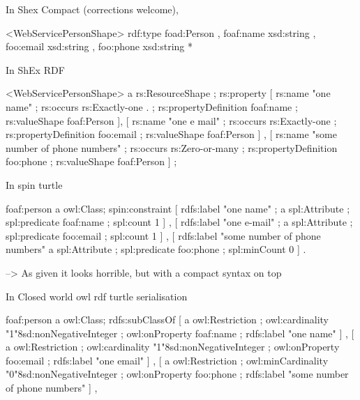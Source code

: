 \documentclass{llncs}
\begin{document}
In Shex Compact (corrections welcome),

\begin{ex}
<WebServicePersonShape> {
  rdf:type foad:Person ,
  foaf:name xsd:string ,
  foo:email xsd:string ,
  foo:phone xsd:string *
}
\end{ex}

In ShEx RDF
\begin{ex}
<WebServicePersonShape> a rs:ResourceShape ;
     rs:property  [ rs:name                "one name" ;
                    rs:occurs              rs:Exactly-one .  ;
                    rs:propertyDefinition  foaf:name ;
                    rs:valueShape          foaf:Person
                   ],
                   [ rs:name                "one e mail" ;
                    rs:occurs              rs:Exactly-one ;
                    rs:propertyDefinition  foo:email ;
                    rs:valueShape          foaf:Person
                   ] ,
                   [ rs:name                "some number of phone numbers" ;
                    rs:occurs              rs:Zero-or-many ;
                    rs:propertyDefinition  foo:phone ;
                    rs:valueShape          foaf:Person
                   ] ;
\end{ex}

In spin turtle

\begin{ex}
foaf:person a owl:Class;
  spin:constraint [ rdfs:label "one name" ;
                    a spl:Attribute ;
                    spl:predicate foaf:name ;
                    spl:count 1 ] ,
                  [ rdfs:label "one e-mail" ;
                    a spl:Attribute ;
                    spl:predicate foo:email ;
                    spl:count 1 ] ,
                  [ rdfs:label "some number of phone numbers"
                    a spl:Attribute ;
                    spl:predicate foo:phone ;
                    spl:minCount 0 ] .
\end{ex}

--> As given it looks horrible, but with a compact syntax on top

In Closed world owl rdf turtle serialisation

\begin{ex}
foaf:person a owl:Class;
  rdfs:subClassOf [ a       owl:Restriction ;
                    owl:cardinality "1"^^xsd:nonNegativeInteger ;
                    owl:onProperty foaf:name ;
                    rdfs:label "one name"
                  ] ,
                  [ a       owl:Restriction ;
                    owl:cardinality "1"^^xsd:nonNegativeInteger ;
                    owl:onProperty foo:email ;
                    rdfs:label "one email"
                  ] ,
                  [ a       owl:Restriction ;
                    owl:minCardinality "0"^^xsd:nonNegativeInteger ;
                    owl:onProperty foo:phone ;
                    rdfs:label "some number of phone numbers"
                  ] ,
\end{ex}
\end{document}

